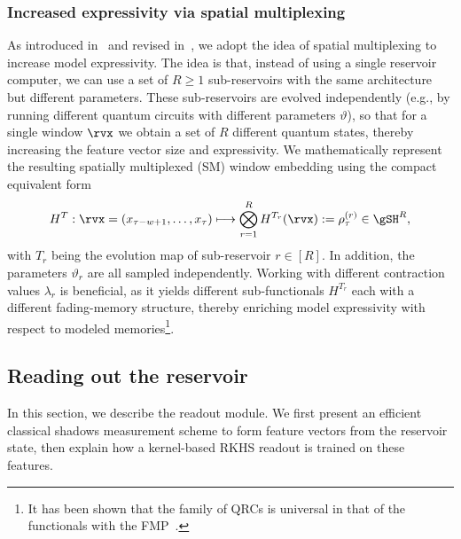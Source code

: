 \subsubsection{Increased expressivity via spatial multiplexing}
As introduced in~\cite{Nakajima_Fujii_Negoro_Mitarai_Kitagawa_2019} and revised in~\cite{Chen_Nurdin_2019,Chen_Nurdin_Yamamoto_2020}, we adopt the idea of spatial multiplexing to increase model expressivity. The idea is that, instead of using a single reservoir computer, we can use a set of $R \geq 1$ sub-reservoirs with the same architecture but different parameters. These sub-reservoirs are evolved independently (e.g., by running different quantum circuits with different parameters $\vartheta$), so that for a single window $\rvx$ we obtain a set of $R$ different quantum states, thereby increasing the feature vector size and expressivity. We mathematically represent the resulting spatially multiplexed (SM) window embedding using the compact equivalent form 
\begin{equation}
    H^T: \rvx = (x_{\tau-w+1}, \dots, x_{\tau}) \longmapsto \bigotimes_{r=1}^R H^{T_r}(\rvx) := \rho_{\tau}^{(r)} \in \gSH^R,
\end{equation}
with $T_r$ being the evolution map of sub-reservoir $r \in [R]$.
In addition, the parameters $\vartheta_r$ are all sampled independently. Working with different contraction values $\lambda_r$ is beneficial, as it yields different sub-functionals $H^{T_r}$ each with a different fading-memory structure, thereby enriching model expressivity with respect to modeled memories\footnote{It has been shown that the family of QRCs is universal in that of the functionals with the FMP~\cite{Nakajima_Fujii_Negoro_Mitarai_Kitagawa_2019}.}.


\subsection{Reading out the reservoir}\label{subsec:K-read}
In this section, we describe the readout module. We first present an efficient classical shadows measurement scheme to form feature vectors from the reservoir state, then explain how a kernel-based RKHS readout is trained on these features.

